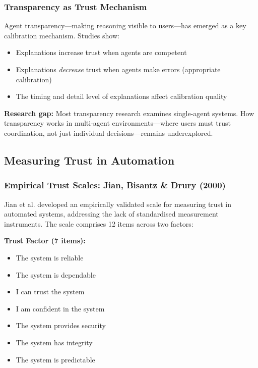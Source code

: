 \subsubsection{Transparency as Trust Mechanism}

Agent transparency---making reasoning visible to users---has emerged as a key calibration mechanism. Studies show:
\begin{itemize}
    \item Explanations increase trust when agents are competent
    \item Explanations \textit{decrease} trust when agents make errors (appropriate calibration)
    \item The timing and detail level of explanations affect calibration quality
\end{itemize}

\textbf{Research gap:} Most transparency research examines single-agent systems. How transparency works in multi-agent environments---where users must trust coordination, not just individual decisions---remains underexplored.

\subsection{Measuring Trust in Automation}
\label{subsec:measuring-trust}

\subsubsection{Empirical Trust Scales: Jian, Bisantz \& Drury (2000)}

Jian et al. \citep{jian2000} developed an empirically validated scale for measuring trust in automated systems, addressing the lack of standardised measurement instruments. The scale comprises 12 items across two factors:

\textbf{Trust Factor (7 items):}
\begin{itemize}
    \item The system is reliable
    \item The system is dependable
    \item I can trust the system
    \item I am confident in the system
    \item The system provides security
    \item The system has integrity
    \item The system is predictable
\end{itemize}

